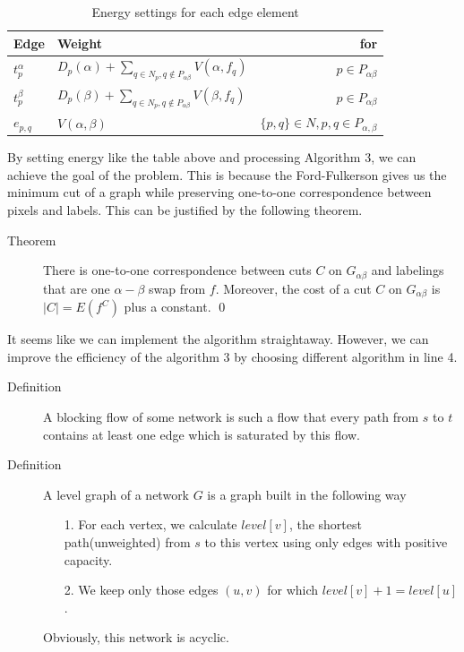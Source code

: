 \documentclass[openany]{memoir}
\begin{document}
\begin{table}
\center
\caption{Energy settings for each edge element}
\begin{tabular}{@{}llr@{}} \toprule
Edge & Weight & for\\ \midrule
$t_{p}^{\alpha}$ & $D_p(\alpha) + \sum_{q \in N_p, q \not\in P_{\alpha\beta}}V(\alpha, f_{q})$ & $p \in P_{\alpha\beta}$ \\
$t_{p}^{\beta}$ & $D_{p}(\beta) + \sum_{q \in N_{p}, q \not\in P_{\alpha\beta}}V(\beta, f_{q})$ & $p \in P_{\alpha\beta}$ \\
$e_{p,q}$ & $V(\alpha, \beta)$ & $\{p,q\} \in N, p,q \in P_{\alpha,\beta}$ \\
\end{tabular}
\end{table}
By setting energy like the table above and processing Algorithm 3, we can achieve the goal of the problem. This is because the Ford-Fulkerson gives us the minimum cut of a graph while preserving one-to-one correspondence between pixels and labels. This can be justified by the following theorem.

\begin{description}
\item[Theorem] There is one-to-one correspondence between cuts $C$ on $G_{\alpha\beta}$ and labelings that are one $\alpha - \beta$ swap from $f$. Moreover, the cost of a cut $C$ on $G_{\alpha\beta}$ is $|C|=E(f^{C})$ plus a constant. \qed
\end{description}

 It seems like we can implement the algorithm straightaway. However, we can improve the efficiency of the algorithm 3 by choosing different algorithm in line 4. 
 
 \begin{description}
 \item[Definition] A blocking flow of some network is such a flow that every path from $s$ to $t$ contains at least one edge which is saturated by this flow.
 \item[Definition] A level graph of a network $G$ is a graph built in the following way
\begin{itemize}
\item[1.] For each vertex, we calculate $level[v]$, the shortest path(unweighted) from $s$ to this vertex using only edges with positive capacity. 
\item[2.] We keep only those edges $(u,v)$ for which $level[v] + 1 = level[u]$.
\end{itemize}
Obviously, this network is acyclic.
\end{description}
\end{document}
